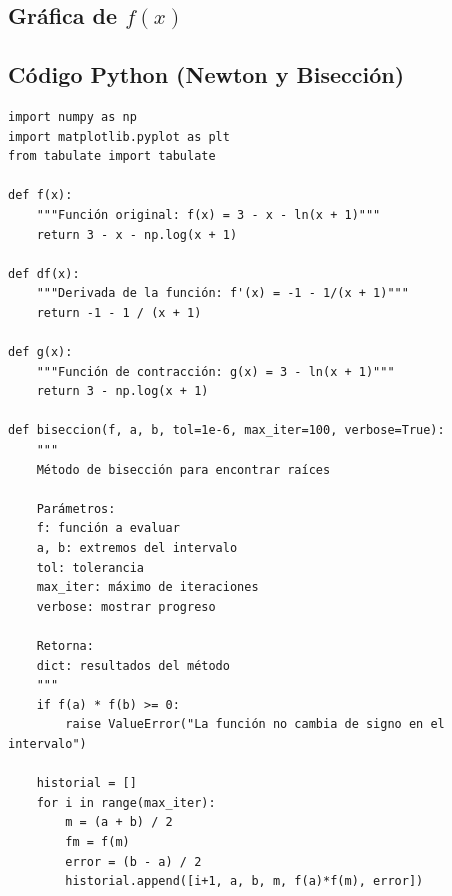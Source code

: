 \documentclass[12pt]{article}
\begin{document}
\begin{center}
\subsection*{Gráfica de \(f(x)\)}

\begin{center}
\end{center}

\subsection*{Código Python (Newton y Bisección)}


\begin{tcolorbox}[title=Codigo python,
                  colback=white,
                  colframe=black,
                  breakable, enhanced]
\begin{lstlisting}[style=mypython]
import numpy as np
import matplotlib.pyplot as plt
from tabulate import tabulate

def f(x):
    """Función original: f(x) = 3 - x - ln(x + 1)"""
    return 3 - x - np.log(x + 1)

def df(x):
    """Derivada de la función: f'(x) = -1 - 1/(x + 1)"""
    return -1 - 1 / (x + 1)

def g(x):
    """Función de contracción: g(x) = 3 - ln(x + 1)"""
    return 3 - np.log(x + 1)

def biseccion(f, a, b, tol=1e-6, max_iter=100, verbose=True):
    """
    Método de bisección para encontrar raíces
    
    Parámetros:
    f: función a evaluar
    a, b: extremos del intervalo
    tol: tolerancia
    max_iter: máximo de iteraciones
    verbose: mostrar progreso
    
    Retorna:
    dict: resultados del método
    """
    if f(a) * f(b) >= 0:
        raise ValueError("La función no cambia de signo en el intervalo")
    
    historial = []
    for i in range(max_iter):
        m = (a + b) / 2
        fm = f(m)
        error = (b - a) / 2
        historial.append([i+1, a, b, m, f(a)*f(m), error])
        

\end{lstlisting}
\end{tcolorbox}
\end{center}
\end{document}
